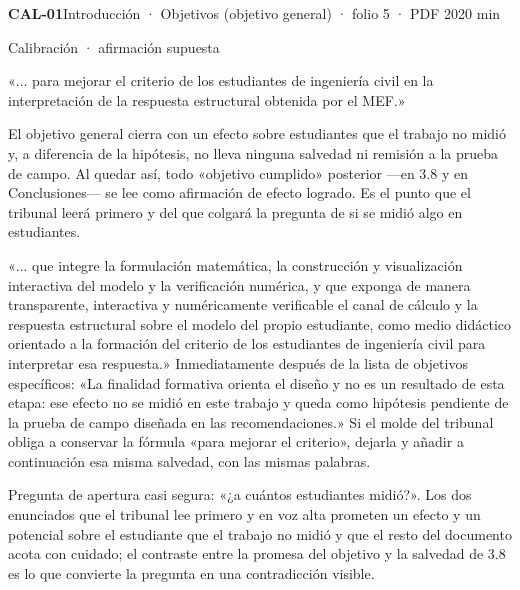 \noindent\casilla\textbf{CAL-01}\quad{}\quad Introducción · Objetivos (objetivo general) · folio 5 · PDF 20\hfill 20 min\par\vspace{1pt}
{\small\color{gris}Calibración · afirmación supuesta}\par
\begin{dice}«... para mejorar el criterio de los estudiantes de ingeniería civil en la interpretación de la respuesta estructural obtenida por el MEF.»\end{dice}
{\small{}El objetivo general cierra con un efecto sobre estudiantes que el trabajo no midió y, a diferencia de la hipótesis, no lleva ninguna salvedad ni remisión a la prueba de campo. Al quedar así, todo «objetivo cumplido» posterior —en 3.8 y en Conclusiones— se lee como afirmación de efecto logrado. Es el punto que el tribunal leerá primero y del que colgará la pregunta de si se midió algo en estudiantes.\par}
\begin{debedecir}«... que integre la formulación matemática, la construcción y visualización interactiva del modelo y la verificación numérica, y que exponga de manera transparente, interactiva y numéricamente verificable el canal de cálculo y la respuesta estructural sobre el modelo del propio estudiante, como medio didáctico orientado a la formación del criterio de los estudiantes de ingeniería civil para interpretar esa respuesta.» Inmediatamente después de la lista de objetivos específicos: «La finalidad formativa orienta el diseño y no es un resultado de esta etapa: ese efecto no se midió en este trabajo y queda como hipótesis pendiente de la prueba de campo diseñada en las recomendaciones.» Si el molde del tribunal obliga a conservar la fórmula «para mejorar el criterio», dejarla y añadir a continuación esa misma salvedad, con las mismas palabras.\end{debedecir}
{\small\color{gris}Pregunta de apertura casi segura: «¿a cuántos estudiantes midió?». Los dos enunciados que el tribunal lee primero y en voz alta prometen un efecto y un potencial sobre el estudiante que el trabajo no midió y que el resto del documento acota con cuidado; el contraste entre la promesa del objetivo y la salvedad de 3.8 es lo que convierte la pregunta en una contradicción visible.\par}
\vspace{6pt}
